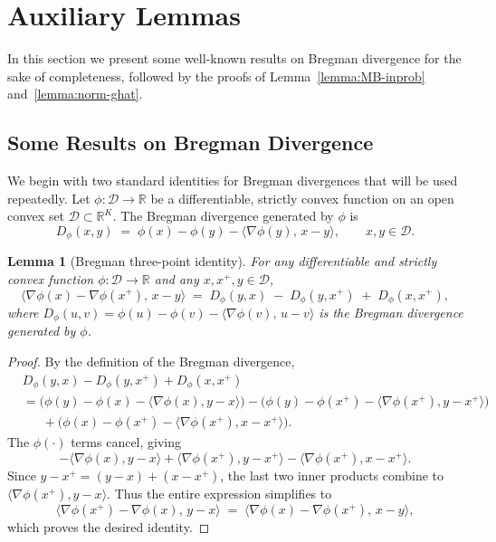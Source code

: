 \documentclass[11pt,letterpaper]{article}
\theoremstyle{plain}
\newtheorem{lemma}{Lemma}
\theoremstyle{definition}  %
\begin{document}
\newpage

\section{Auxiliary Lemmas}
\label{app:Aux-lemmas}

In this section we present some well-known results on Bregman divergence for the sake of completeness, followed by the proofs of Lemma~\ref{lemma:MB-inprob} and~\ref{lemma:norm-ghat}.  

\subsection*{Some Results on Bregman Divergence}

We begin with two standard identities for Bregman divergences that will be used repeatedly.
Let $\phi:\mathcal{D}\to\mathbb{R}$ be a differentiable, strictly convex function on an open convex set $\mathcal{D}\subset\mathbb{R}^K$.
The Bregman divergence generated by $\phi$ is
\[
D_\phi(x,y) \;=\; \phi(x)-\phi(y)-\langle \nabla\phi(y),\,x-y\rangle,
\qquad x,y\in\mathcal{D}.
\]

\begin{lemma}[Bregman three-point identity]
\label{lem:three-point-alt}
For any differentiable and strictly convex function $\phi:\mathcal{D}\to\mathbb{R}$ 
and any $x, x^+, y \in \mathcal{D}$,
\[
\big\langle \nabla\phi(x)-\nabla\phi(x^+),\, x - y \big\rangle
\;=\;
D_\phi(y,x)\;-\;D_\phi(y,x^+)\;+\;D_\phi(x,x^+),
\]
where $D_\phi(u,v)=\phi(u)-\phi(v)-\langle\nabla\phi(v),\,u-v\rangle$ 
is the Bregman divergence generated by $\phi$.
\end{lemma}

\begin{proof}
By the definition of the Bregman divergence,
\begin{align*}
&D_\phi(y,x)-D_\phi(y,x^+)+D_\phi(x,x^+) \\
&= \big(\phi(y)-\phi(x)-\langle\nabla\phi(x),y-x\rangle\big)
   -\big(\phi(y)-\phi(x^+)-\langle\nabla\phi(x^+),y-x^+\rangle\big) \\
&\quad\;\;+\big(\phi(x)-\phi(x^+)-\langle\nabla\phi(x^+),x-x^+\rangle\big).
\end{align*}
The $\phi(\cdot)$ terms cancel, giving
\[
-\langle\nabla\phi(x),y-x\rangle
+\langle\nabla\phi(x^+),y-x^+\rangle
-\langle\nabla\phi(x^+),x-x^+\rangle.
\]
Since $y-x^+=(y-x)+(x-x^+)$, the last two inner products combine to
$\langle\nabla\phi(x^+),y-x\rangle$.
Thus the entire expression simplifies to
\[
\langle\nabla\phi(x^+)-\nabla\phi(x),\,y-x\rangle
\;=\;
\langle\nabla\phi(x)-\nabla\phi(x^+),\,x-y\rangle,
\]
which proves the desired identity.
\end{proof}
\end{document}
